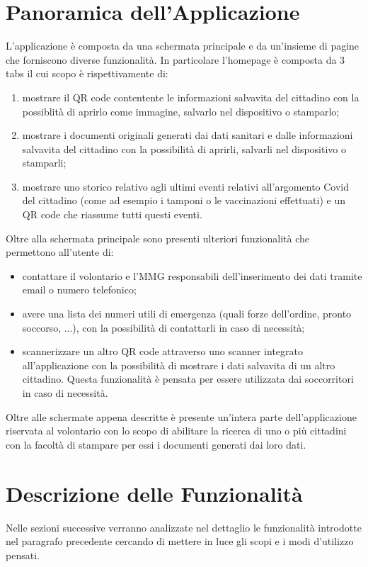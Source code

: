 \documentclass[12pt,a4paper,twoside,openright,titlepage]{book}
\begin{document}
\section{Panoramica dell'Applicazione}
L'applicazione è composta da una schermata principale e da un'insieme di pagine che forniscono diverse funzionalità. In particolare l'homepage è composta da 3 tabs il cui scopo è rispettivamente di:
\begin{enumerate}
\item mostrare il QR code contentente le informazioni salvavita del cittadino con la possiblità di aprirlo come immagine, salvarlo nel dispositivo o stamparlo;
\item mostrare i documenti originali generati dai dati sanitari e dalle informazioni salvavita del cittadino con la possibilità di aprirli, salvarli nel dispositivo o stamparli;
\item mostrare uno storico relativo agli ultimi eventi relativi all'argomento Covid del cittadino (come ad esempio i tamponi o le vaccinazioni effettuati) e un QR code che riassume tutti questi eventi.
\end{enumerate}
Oltre alla schermata principale sono presenti ulteriori funzionalità che permettono all'utente di:
\begin{itemize}
\item contattare il volontario e l'MMG responsabili dell'inserimento dei dati tramite email o numero telefonico;
\item avere una lista dei numeri utili di emergenza (quali forze dell'ordine, pronto soccorso, ...), con la possibilità di contattarli in caso di necessità;
\item scannerizzare un altro QR code attraverso uno scanner integrato all'applicazione con la possibilità di mostrare i dati salvavita di un altro cittadino. Questa funzionalità è pensata per essere utilizzata dai soccorritori in caso di necessità.
\end{itemize}
Oltre alle schermate appena descritte è presente un'intera parte dell'applicazione riservata al volontario con lo scopo di abilitare la ricerca di uno o più cittadini con la facoltà di stampare per essi i documenti generati dai loro dati.

\section{Descrizione delle Funzionalità}
Nelle sezioni successive verranno analizzate nel dettaglio le funzionalità introdotte nel paragrafo precedente cercando di mettere in luce gli scopi e i modi d'utilizzo pensati.
\end{document}
